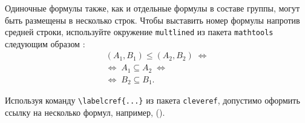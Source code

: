 Одиночные формулы также, как и отдельные формулы в составе группы, могут быть размещены в несколько строк. Чтобы выставить номер формулы напротив средней строки, используйте окружение \verb|multlined| из пакета \verb|mathtools| следующим образом \cite{Ganter1999}:
\begin{equation} %
\label{eq:fConcept-order-G}
\begin{multlined}
(A_1,B_1)\leq (A_2,B_2)\; \Leftrightarrow \\  \Leftrightarrow\; A_1\subseteq A_2\; \Leftrightarrow \\ \Leftrightarrow\; B_2\subseteq B_1.
\end{multlined}
\end{equation}


Используя команду \verb|\labelcref{...}| из пакета \verb|cleveref|, допустимо оформить ссылку на несколько формул, например, ().
